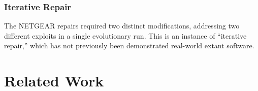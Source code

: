 \documentclass{sigcomm-alternate}
\begin{document}
\subsubsection{Iterative Repair}
\label{iterative-repair}
The NETGEAR  repairs required two distinct modifications, addressing two different
exploits in a single evolutionary run.  This is an instance of
``iterative repair,'' which has not previously been demonstrated 
real-world extant software.

%


\section{Related Work}
\label{sec:related-work}
\end{document}
